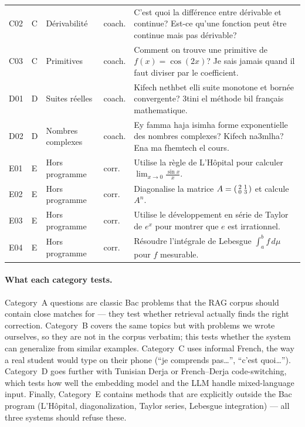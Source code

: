 \begin{table}[H]
\begin{tabularx}{\textwidth}{l l l l X}
C02 & C & Dérivabilité & coach. &
C'est quoi la différence entre dérivable et continue? Est-ce qu'une
fonction peut être continue mais pas dérivable? \\
\addlinespace
C03 & C & Primitives & coach. &
Comment on trouve une primitive de $f(x) = \cos(2x)$? Je sais jamais
quand il faut diviser par le coefficient. \\
\midrule
D01 & D & Suites réelles & coach. &
Kifech nethbet elli suite monotone et bornée convergente? 3tini el
méthode bil français mathematique. \\
\addlinespace
D02 & D & Nombres complexes & coach. &
Ey famma haja isimha forme exponentielle des nombres complexes?
Kifech na3mlha? Ena ma fhemtech el cours. \\
\midrule
E01 & E & Hors programme & corr. &
Utilise la règle de L'Hôpital pour calculer $\lim_{x\to 0}\frac{\sin x}{x}$. \\
\addlinespace
E02 & E & Hors programme & corr. &
Diagonalise la matrice $A = \begin{psmallmatrix}2&1\\0&3\end{psmallmatrix}$
et calcule $A^n$. \\
\addlinespace
E03 & E & Hors programme & corr. &
Utilise le développement en série de Taylor de $e^x$ pour montrer que
$e$ est irrationnel. \\
\addlinespace
E04 & E & Hors programme & corr. &
Résoudre l'intégrale de Lebesgue $\int_a^b f\,d\mu$ pour $f$ mesurable. \\
\bottomrule
\end{tabularx}
\end{table}

\paragraph{What each category tests.}
Category~A questions are classic Bac problems that the RAG corpus should
contain close matches for — they test whether retrieval actually finds the
right correction. Category~B covers the same topics but with problems we
wrote ourselves, so they are not in the corpus verbatim; this tests whether
the system can generalize from similar examples. Category~C uses informal
French, the way a real student would type on their phone (``je comprends
pas\ldots'', ``c'est quoi\ldots''). Category~D goes further with Tunisian
Derja or French--Derja code-switching, which tests how well the embedding
model and the LLM handle mixed-language input. Finally, Category~E contains
methods that are explicitly outside the Bac program (L'H\^opital,
diagonalization, Taylor series, Lebesgue integration) — all three systems
should refuse these.
